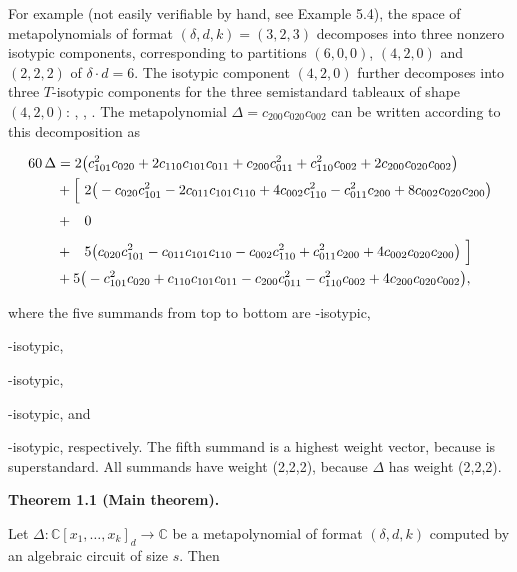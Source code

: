 For example (not easily verifiable by hand, see Example 5.4), the space of metapolynomials of format $(\delta,d,k)=(3,2,3)$ decomposes into three nonzero isotypic components, corresponding to partitions $(6,0,0)$, $(4,2,0)$ and $(2,2,2)$ of $\delta\cdot d=6$. The isotypic component $(4,2,0)$ further decomposes into three $T$-isotypic components for the three semistandard tableaux of shape $(4,2,0)$: 
, 
, 
. The metapolynomial $\Delta=c_{200}c_{020}c_{002}$ can be written according to this decomposition as



\[\begin{aligned}
\displaystyle 60\,\Delta & \displaystyle= \displaystyle 2\big{(}c_{101}^{2}c_{020}+2c_{110}c_{101}c_{011}+c_{200}c_{011}^{2}+c_{110}^{2}c_{002}+2c_{200}c_{020}c_{002}\big{)} \\
 & \displaystyle+ \displaystyle\Big{[}\ 2\big{(}-c_{020}c_{101}^{2}-2c_{011}c_{101}c_{110}+4c_{002}c_{110}^{2}-c_{011}^{2}c_{200}+8c_{002}c_{020}c_{200}\big{)} \\
 & \displaystyle+ \displaystyle\phantom{\Big{[}\ }0 \\
 & \displaystyle+ \displaystyle\phantom{\Big{[}\ }5\big{(}c_{020}c_{101}^{2}-c_{011}c_{101}c_{110}-c_{002}c_{110}^{2}+c_{011}^{2}c_{200}+4c_{002}c_{020}c_{200}\big{)}\ \Big{]} \\
 & \displaystyle+ \displaystyle 5\big{(}-c_{101}^{2}c_{020}+c_{110}c_{101}c_{011}-c_{200}c_{011}^{2}-c_{110}^{2}c_{002}+4c_{200}c_{020}c_{002}\big{)},
\end{aligned}\]


where the five summands from top to bottom are 
-isotypic,

-isotypic,

-isotypic,

-isotypic,
and

-isotypic, respectively.
The fifth summand is a highest weight vector, because 
is superstandard.
All summands have weight (2,2,2), because $\Delta$ has weight (2,2,2).





\par\medskip\noindent\textbf{Theorem 1.1 (Main theorem).}\par



Let $\Delta\colon\mathbb{C}[x_{1},\dots,x_{k}]_{d}\to\mathbb{C}$ be a metapolynomial of format $(\delta,d,k)$ computed by an algebraic circuit of size $s$.
Then



